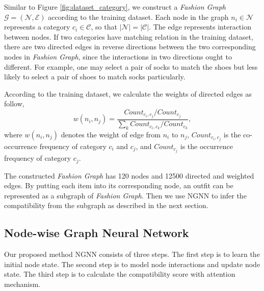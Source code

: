 \documentclass[sigconf]{acmart}
\begin{document}
Similar to Figure \ref{fig:dataset_category}, we construct a \emph{Fashion Graph} $\mathcal{G} = (\mathcal{N}, \mathcal{E})$ according to the training dataset.
Each node in the graph $n_{i} \in \mathcal{N}$ represents a category $c_{i} \in \mathcal{C}$, so that $\left | \mathcal{N} \right | = \left | \mathcal{C} \right |$. The edge represents interaction between nodes.
If two categories have matching relation in the training dataset, there are two directed edges in reverse directions between the two corresponding nodes in \emph{Fashion Graph}, since the interactions in two directions ought to different. For example, one may select a pair of socks to match the shoes but less likely to select a pair of shoes to match socks particularly.


According to the training dataset, we calculate the weights of directed edges as follow,
\begin{equation} \label{uniform_A}
w(n_{i}, n_{j}) = \frac{Count_{c_{i}, c_{j}}/Count_{c_{j}}}{\sum_{k} Count_{c_{i}, c_{k}}/Count_{c_{k}}},
\end{equation}
where $w(n_{i}, n_{j})$ denotes the weight of edge from $n_{i}$ to $n_{j}$, $Count_{c_i, c_j}$ is the co-occurrence frequency of category $c_{i}$ and $c_{j}$, and $Count_{c_{j}}$ is the occurrence frequency of category $c_{j}$.

The constructed \emph{Fashion Graph} has 120 nodes and 12500 directed and weighted edges.
By putting each item into its corresponding node, an outfit can be represented as a subgraph of \emph{Fashion Graph}. Then we use NGNN to infer the compatibility from the subgraph as described in the next section.



\subsection{Node-wise Graph Neural Network}


Our proposed method NGNN consists of three steps. The first step is to learn the initial node state. The second step is to model node interactions and update node state. The third step is to calculate the compatibility score with attention mechanism.
\end{document}
